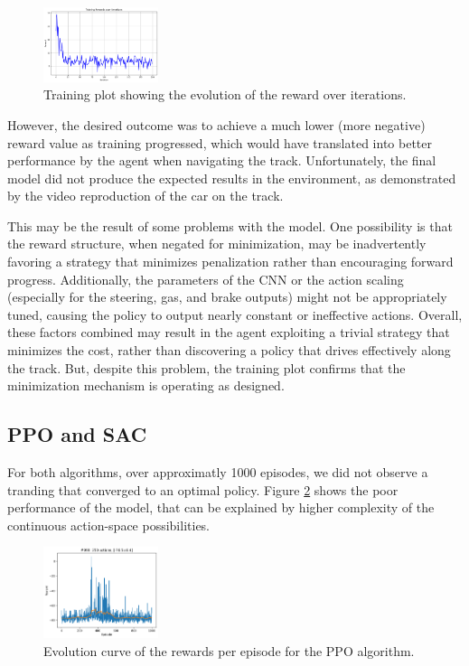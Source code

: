 \documentclass[../CSC_52081_EP.tex]{subfiles}
\begin{document}
\begin{figure}[H]
    \centering
    \includegraphics[width=0.3\textwidth]{figures/CEM_train.png}
    \caption{Training plot showing the evolution of the reward over iterations.}
    \label{fig:train_plot}
\end{figure}

However, the desired outcome was to achieve a much lower (more negative) reward value as training progressed, which would have translated into better performance by the agent when navigating the track. Unfortunately, the final model did not produce the expected results in the environment, as demonstrated by the video reproduction of the car on the track.

This may be the result of some problems with the model. One possibility is that the reward structure, when negated for minimization, may be inadvertently favoring a strategy that minimizes penalization rather than encouraging forward progress. Additionally, the parameters of the CNN or the action scaling (especially for the steering, gas, and brake outputs) might not be appropriately tuned, causing the policy to output nearly constant or ineffective actions. Overall, these factors combined may result in the agent exploiting a trivial strategy that minimizes the cost, rather than discovering a policy that drives effectively along the track. But, despite this problem, the training plot confirms that the minimization mechanism is operating as designed.

\subsection{PPO and SAC}

For both algorithms, over approximatly 1000 episodes, we did not observe a tranding that converged to an optimal policy. Figure \ref{fig:PPO_train} shows the poor performance of the model, that can be explained by higher complexity of the continuous action-space possibilities.

\begin{figure}[H]
    \centering
    \includegraphics[width=0.3\textwidth]{figures/reward_per_episode_PPO.png}
    \caption{Evolution curve of the rewards per episode for the PPO algorithm.}
    \label{fig:PPO_train}
\end{figure}
\end{document}
